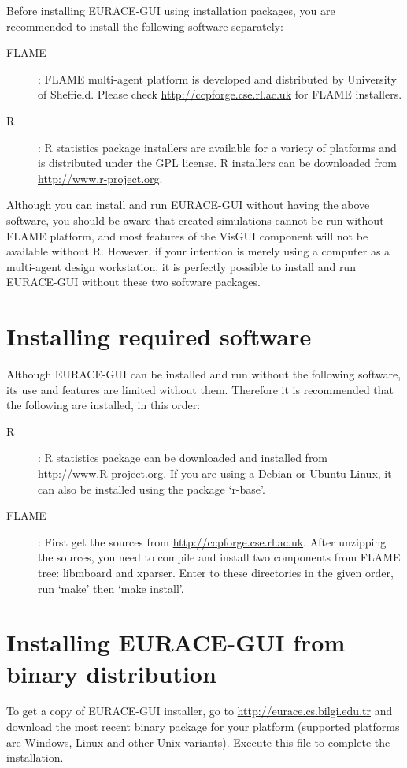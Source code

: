 \documentclass[urop]{socreport}
\begin{document}
Before installing EURACE-GUI using installation packages, you are recommended to install the following software separately:
\begin{description}
\item[FLAME]: FLAME multi-agent platform is developed and distributed by University of Sheffield. Please check \url{http://ccpforge.cse.rl.ac.uk} for FLAME installers.
\item[R]: R statistics package installers are available for a variety of platforms and is distributed under the GPL license. R installers can be downloaded from \url{http://www.r-project.org}.
\end{description}
Although you can install and run EURACE-GUI without having the above software, you should be aware that created simulations cannot be run without FLAME platform, and most features of the VisGUI component will not be available without R. However, if your intention is merely using a computer as a multi-agent design workstation, it is perfectly possible to install and run EURACE-GUI without these two software packages.

\section{Installing required software}
Although EURACE-GUI can be installed and run without the following software, its use and features are limited without them. Therefore it is recommended that the following are installed, in this order:
\begin{description}
\item[R]: R statistics package can be downloaded and installed from \url{http://www.R-project.org}. If you are using a Debian or Ubuntu Linux, it can also be installed using the package `r-base'.
\item[FLAME]: First get the sources from \url{http://ccpforge.cse.rl.ac.uk}. After unzipping the sources, you need to compile and install two components from FLAME tree: libmboard and xparser. Enter to these directories in the given order, run `make' then `make install'.
\end{description}

\section{Installing EURACE-GUI from binary distribution}
To get a copy of EURACE-GUI installer, go to \url{http://eurace.cs.bilgi.edu.tr} and download the most recent binary package for your platform (supported platforms are Windows, Linux and other Unix variants). Execute this file to complete the installation.
\end{document}
